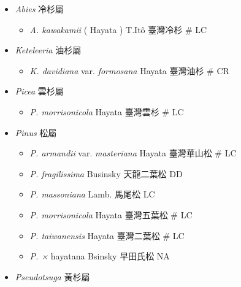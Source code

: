 
  \begin{itemize}
 \item[] \textit{Abies} 冷杉屬
                            
  \begin{itemize}
        \item[] \textit{A. kawakamii} ( Hayata ) T.Itô  臺灣冷杉  \# LC
  \end{itemize}
 \item[] \textit{Keteleeria} 油杉屬
                            
  \begin{itemize}
        \item[] \textit{K. davidiana} var. \textit{formosana} Hayata 
                                    臺灣油杉  \# CR
  \end{itemize}
 \item[] \textit{Picea} 雲杉屬
                            
  \begin{itemize}
        \item[] \textit{P. morrisonicola} Hayata  臺灣雲杉  \# LC
  \end{itemize}
 \item[] \textit{Pinus} 松屬
                            
  \begin{itemize}
        \item[] \textit{P. armandii} var. \textit{masteriana} Hayata 
                                    臺灣華山松  \# LC
        \item[] \textit{P. fragilissima} Businsky  天龍二葉松   DD
        \item[] \textit{P. massoniana} Lamb.  馬尾松   LC
        \item[] \textit{P. morrisonicola} Hayata  臺灣五葉松  \# LC
        \item[] \textit{P. taiwanensis} Hayata  臺灣二葉松  \# LC
        \item[] \textit{P. ×} hayatana \textit{} Bsinsky 
                                    早田氏松   NA
  \end{itemize}
 \item[] \textit{Pseudotsuga} 黃杉屬
                            

\end{itemize}
